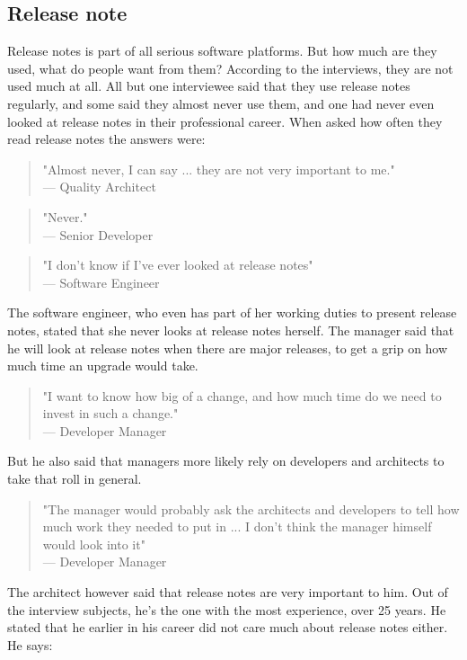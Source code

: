 \documentclass{cslthse-msc}
\begin{document}
    \subsection{Release note}
    Release notes is part of all serious software platforms. But how much are they used, what do people want from them? According to the interviews, they are not used much at all. All but one interviewee said that they use release notes regularly, and some said they almost never use them, and one had never even looked at release notes in their professional career. When asked how often they read release notes the answers were:
    \begin{quote}
        "Almost never, I can say ... they are not very important to me."\\
        --- Quality Architect
    \end{quote}
    \begin{quote}
        "Never." \\
        --- Senior Developer
    \end{quote}
    \begin{quote}
        "I don't know if I've ever looked at release notes" \\
        --- Software Engineer
    \end{quote}
    The software engineer, who even has part of her working duties to present release notes, stated that she never looks at release notes herself.
    The manager said that he will look at release notes when there are major releases, to get a grip on how much time an upgrade would take.
    \begin{quote}
        "I want to know how big of a change, and how much time do we need to invest in such a change."\\
        --- Developer Manager
    \end{quote}
    But he also said that managers more likely rely on developers and architects to take that roll in general.
    \begin{quote}
        "The manager would probably ask the architects and developers to tell how much work they needed to put in ... I don't think the manager himself would look into it"\\
        --- Developer Manager
    \end{quote}
    The architect however said that release notes are very important to him. Out of the interview subjects, he's the one with the most experience, over 25 years. He stated that he earlier in his career did not care much about release notes either. He says:
\end{document}
